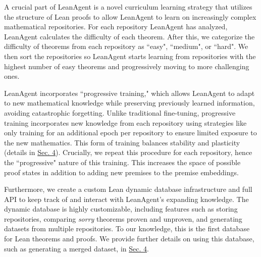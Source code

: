 \documentclass{article} %
\begin{document}
A crucial part of LeanAgent is a novel curriculum learning strategy that utilizes the structure of Lean proofs to allow LeanAgent to learn on increasingly complex mathematical repositories. For each repository LeanAgent has analyzed, LeanAgent calculates the difficulty of each theorem. After this, we categorize the difficulty of theorems from each repository as ``easy", ``medium", or ``hard". We then sort the repositories so LeanAgent starts learning from repositories with the highest number of easy theorems and progressively moving to more challenging ones.

LeanAgent incorporates ``progressive training," which allows LeanAgent to adapt to new mathematical knowledge while preserving previously learned information, avoiding catastrophic forgetting. Unlike traditional fine-tuning, progressive training  incorporates new knowledge from each repository using strategies like only training for an additional epoch per repository to ensure limited exposure to the new mathematics. This form of training balances stability and plasticity (details in \hyperref[sec:methodology]{Sec. 4}). Crucially, we repeat this procedure for each repository, hence the ``progressive" nature of this training. This increases the space of possible proof states in addition to adding new premises to the premise embeddings.

Furthermore, we create a custom Lean dynamic database infrastructure and full API to keep track of and interact with LeanAgent's expanding knowledge. The dynamic database is highly customizable, including features such as storing repositories, comparing \textit{sorry} theorems proven and unproven, and generating datasets from multiple repositories. To our knowledge, this is the first database for Lean theorems and proofs. We provide further details on using this database, such as generating a merged dataset, in \hyperref[sec:methodology]{Sec. 4}.
\end{document}
